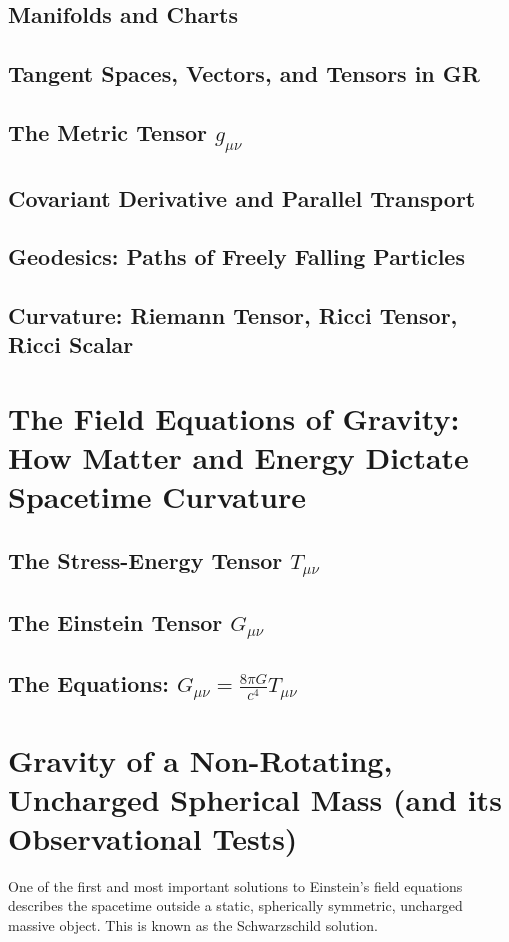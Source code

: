 \documentclass{amsart}
\theoremstyle{definition}
\theoremstyle{remark}
\begin{document}
\subsection{Manifolds and Charts}
\subsection{Tangent Spaces, Vectors, and Tensors in GR}
\subsection{The Metric Tensor $g_{\mu\nu}$}
\subsection{Covariant Derivative and Parallel Transport}
\subsection{Geodesics: Paths of Freely Falling Particles}
\subsection{Curvature: Riemann Tensor, Ricci Tensor, Ricci Scalar}

\section{The Field Equations of Gravity: How Matter and Energy Dictate Spacetime Curvature}
\label{sec:efe}
\subsection{The Stress-Energy Tensor $T_{\mu\nu}$}
\subsection{The Einstein Tensor $G_{\mu\nu}$}
\subsection{The Equations: $G_{\mu\nu} = \frac{8\pi G}{c^4} T_{\mu\nu}$}

\section{Gravity of a Non-Rotating, Uncharged Spherical Mass (and its Observational Tests)}
\label{sec:schwarzschild_tests}
One of the first and most important solutions to Einstein's field equations describes the spacetime outside a static, spherically symmetric, uncharged massive object.
This is known as the Schwarzschild solution.
\end{document}
